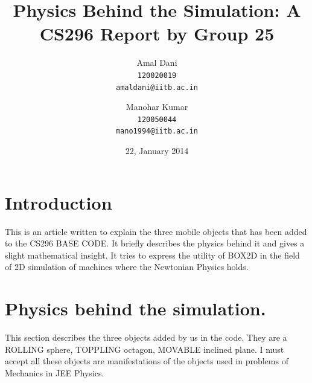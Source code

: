 \documentclass[11 pt]{article}
\begin{document}
\title{Physics Behind the Simulation: A CS296 Report by Group 25}
\author{ Amal Dani\\
  \texttt{120020019}\\
  \texttt{amaldani@iitb.ac.in}
  \and
         Manohar Kumar\\
  \texttt{120050044}\\
  \texttt{mano1994@iitb.ac.in}}
\date{22, January 2014}
\maketitle
\section{Introduction}
This is an article written to explain the three mobile objects that has been added to the CS296 BASE CODE. It briefly describes the physics behind it and gives a slight mathematical insight. It tries to express the utility of BOX2D\cite{box2d} in the field of 2D simulation of machines where the Newtonian Physics holds.
\section{Physics behind the simulation.}
This section describes the three objects added by us in the code. They are a ROLLING sphere, TOPPLING octagon, MOVABLE inclined plane. I must accept all these objects are manifestations of the objects used in problems of Mechanics in JEE Physics.
\end{document}
